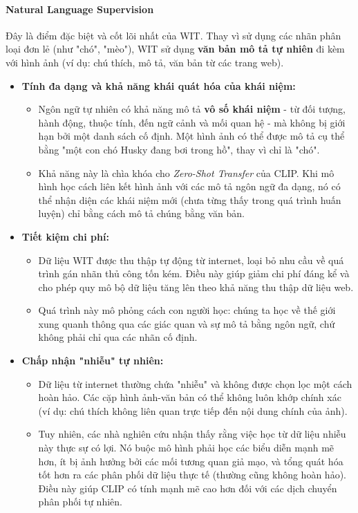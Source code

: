 \paragraph{Natural Language Supervision}
Đây là điểm đặc biệt và cốt lõi nhất của WIT. Thay vì sử dụng các nhãn phân loại đơn lẻ (như "chó", "mèo"), WIT sử dụng \textbf{văn bản mô tả tự nhiên} đi kèm với hình ảnh (ví dụ: chú thích, mô tả, văn bản từ các trang web).
\begin{itemize}
\item \textbf{Tính đa dạng và khả năng khái quát hóa của khái niệm:}
\begin{itemize}
\item Ngôn ngữ tự nhiên có khả năng mô tả \textbf{vô số khái niệm} - từ đối tượng, hành động, thuộc tính, đến ngữ cảnh và mối quan hệ - mà không bị giới hạn bởi một danh sách cố định. Một hình ảnh có thể được mô tả cụ thể bằng "một con chó Husky đang bơi trong hồ", thay vì chỉ là "chó".
\item Khả năng này là chìa khóa cho \textit{Zero-Shot Transfer} của CLIP. Khi mô hình học cách liên kết hình ảnh với các mô tả ngôn ngữ đa dạng, nó có thể nhận diện các khái niệm mới (chưa từng thấy trong quá trình huấn luyện) chỉ bằng cách mô tả chúng bằng văn bản.
\end{itemize}
\item \textbf{Tiết kiệm chi phí:}
\begin{itemize}
\item Dữ liệu WIT được thu thập tự động từ internet, loại bỏ nhu cầu về quá trình gán nhãn thủ công tốn kém. Điều này giúp giảm chi phí đáng kể và cho phép quy mô bộ dữ liệu tăng lên theo khả năng thu thập dữ liệu web.
\item Quá trình này mô phỏng cách con người học: chúng ta học về thế giới xung quanh thông qua các giác quan và sự mô tả bằng ngôn ngữ, chứ không phải chỉ qua các nhãn cố định.
\end{itemize}
\item \textbf{Chấp nhận "nhiễu" tự nhiên:}
\begin{itemize}
\item Dữ liệu từ internet thường chứa "nhiễu" và không được chọn lọc một cách hoàn hảo. Các cặp hình ảnh-văn bản có thể không luôn khớp chính xác (ví dụ: chú thích không liên quan trực tiếp đến nội dung chính của ảnh).
\item Tuy nhiên, các nhà nghiên cứu nhận thấy rằng việc học từ dữ liệu nhiễu này thực sự có lợi. Nó buộc mô hình phải học các biểu diễn mạnh mẽ hơn, ít bị ảnh hưởng bởi các mối tương quan giả mạo, và tổng quát hóa tốt hơn ra các phân phối dữ liệu thực tế (thường cũng không hoàn hảo). Điều này giúp CLIP có tính mạnh mẽ cao hơn đối với các dịch chuyển phân phối tự nhiên.
\end{itemize}
\end{itemize}

